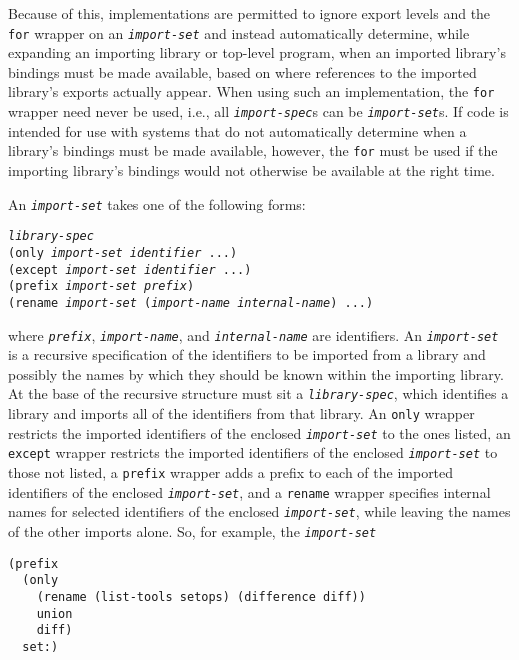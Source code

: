Because of this, implementations are permitted to ignore export levels and
the \texttt{for} wrapper on an \texttt{\textit{import-set}} and instead automatically
determine, while expanding an importing library or top-level program, when
an imported library's bindings must be made available, based on where
references to the imported library's exports actually appear.
When using such an implementation, the \texttt{for} wrapper need never be used,
i.e., all \texttt{\textit{import-spec}}s can be \texttt{\textit{import-set}}s.
If code is intended for use with systems that do not automatically determine
when a library's bindings must be made available, however, the \texttt{for}
must be used if the importing library's bindings would not otherwise be
available at the right time.


\label{libraries_s8}\label{libraries_s9}\label{libraries_s10}\label{libraries_s11}\label{libraries_s12}An \texttt{\textit{import-set}} takes one of the following forms:


\begin{alltt}
\textit{library-spec}
(only \textit{import-set} \textit{identifier} ...)
(except \textit{import-set} \textit{identifier} ...)
(prefix \textit{import-set} \textit{prefix})
(rename \textit{import-set} (\textit{import-name} \textit{internal-name}) ...)
\end{alltt}


where \texttt{\textit{prefix}}, \texttt{\textit{import-name}}, and \texttt{\textit{internal-name}} are identifiers.
An \texttt{\textit{import-set}} is a recursive specification of the identifiers to be
imported from a library and possibly the names by which they should be known
within the importing library.
At the base of the recursive structure must sit a \texttt{\textit{library-spec}},
which identifies a library and imports all of the identifiers from that
library.
An \texttt{only} wrapper restricts the imported identifiers of the
enclosed \texttt{\textit{import-set}} to the ones listed, an \texttt{except} wrapper
restricts the imported identifiers of the enclosed \texttt{\textit{import-set}} to
those not listed, a \texttt{prefix} wrapper adds a prefix to each of the
imported identifiers of the enclosed \texttt{\textit{import-set}}, and a
\texttt{rename} wrapper specifies internal names for selected identifiers
of the enclosed \texttt{\textit{import-set}}, while leaving the names of the other
imports alone.
So, for example, the \texttt{\textit{import-set}}


\begin{alltt}
(prefix
  (only
    (rename (list-tools setops) (difference diff))
    union
    diff)
  set:)
\end{alltt}



